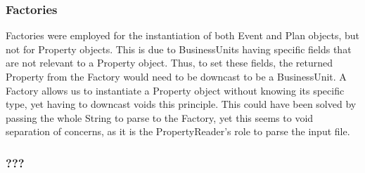 \documentclass[]{article}
\begin{document}
\subsubsection*{Factories}
Factories were employed for the instantiation of both Event and Plan objects, but not for Property objects. This is due to BusinessUnits having specific fields that are not relevant to a Property object. Thus, to set these fields, the returned Property from the Factory would need to be downcast to be a BusinessUnit. A Factory allows us to instantiate a Property object without knowing its specific type, yet having to downcast voids this principle. This could have been solved by passing the whole String to parse to the Factory, yet this seems to void separation of concerns, as it is the PropertyReader's role to parse the input file.

\subsubsection*{???}

\end{document}

